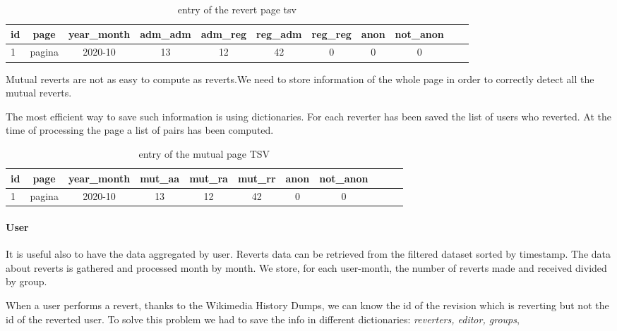 \begin{table}[H]
    \centering
    \begin{tabularx}{\columnwidth}{@{}Xcccccccccc@{}}
        \midrule
        \textbf{id} & \textbf{page} & \textbf{year\_month} & \textbf{adm\_adm} & \textbf{adm\_reg} & \textbf{reg\_adm} & \textbf{reg\_reg} & \textbf{anon} & \textbf{not\_anon}\\ \toprule
        1 & pagina & 2020-10 & 13 & 12 & 42 & 0 & 0 & 0 \\
        
         \bottomrule
    \end{tabularx}
    
    \caption{entry of the revert page tsv \label{table:revertpage}}
\end{table}

Mutual reverts are not as easy to compute as reverts.We need to store information of the whole page
in order to correctly detect all the mutual reverts.

The most efficient way to save such information is using dictionaries. For each reverter has been
saved the list of users who reverted. At the time of processing the page a list of pairs has been
computed.

\begin{table}[H]
    \centering
    \begin{tabularx}{\columnwidth}{@{}Xcccccccccc@{}}
        \midrule
        \textbf{id} & \textbf{page} & \textbf{year\_month} & \textbf{mut\_aa} & \textbf{mut\_ra}  & \textbf{mut\_rr} & \textbf{anon} & \textbf{not\_anon}\\ \toprule
        1 & pagina & 2020-10 & 13 & 12 & 42  & 0 & 0 \\
         \bottomrule
    \end{tabularx}
    
    \caption{entry of the mutual page TSV \label{table:mutualpage}}
\end{table}

\paragraph*{User}
It is useful also to have the data aggregated by user. Reverts data can be retrieved from the
filtered dataset sorted by timestamp. The data about reverts is gathered and processed month by
month. We store, for each user-month, the number of reverts made and received divided by group.

When a user performs a revert, thanks to the Wikimedia History Dumps, we can know the id of the
revision which is reverting but not the id of the reverted user. To solve this problem we
had to save the info in different dictionaries: \textit{reverters, editor, groups}, 
\bigskip

